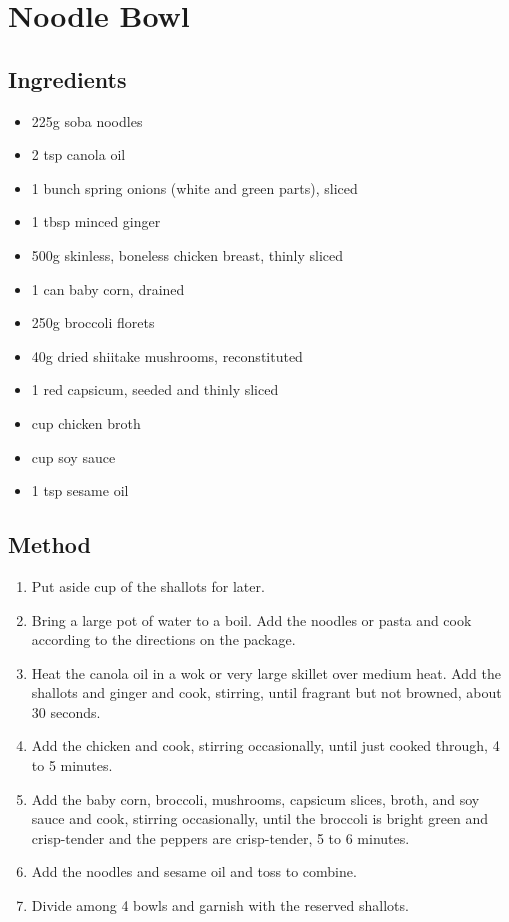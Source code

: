 \clearpage
\section{Noodle Bowl}


\subsection{Ingredients}

\begin{itemize}
	\item 225g soba noodles
	\item 2 tsp canola oil
	\item 1 bunch spring onions (white and green parts), sliced
	\item 1 tbsp minced ginger
	\item 500g skinless, boneless chicken breast, thinly sliced
	\item 1 can baby corn, drained
	\item 250g broccoli florets
	\item 40g dried shiitake mushrooms, reconstituted
	\item 1 red capsicum, seeded and thinly sliced
	\item {} cup chicken broth
	\item {} cup soy sauce
	\item 1 tsp sesame oil
\end{itemize}

\subsection{Method}

\begin{enumerate}
	\item Put aside  cup of the shallots for later.
	\item Bring a large pot of water to a boil. Add the noodles or pasta and cook according to the directions on the package.
	\item Heat the canola oil in a wok or very large skillet over medium heat. Add the shallots and ginger and cook, stirring, until fragrant but not browned, about 30 seconds.
	\item Add the chicken and cook, stirring occasionally, until just cooked through, 4 to 5 minutes.
	\item Add the baby corn, broccoli, mushrooms, capsicum slices, broth, and soy sauce and cook, stirring occasionally, until the broccoli is bright green and crisp-tender and the peppers are crisp-tender, 5 to 6 minutes.
	\item Add the noodles and sesame oil and toss to combine.
	\item Divide among 4 bowls and garnish with the reserved shallots.
\end{enumerate}
